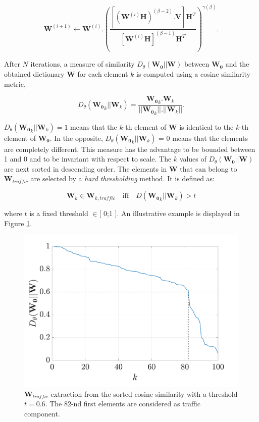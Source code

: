 \documentclass[twocolumn]{svjour3}          %
\begin{document}
\begin{equation}\label{eq:updateW_unsup}
\textbf{W}^{(i+1)} \leftarrow \mathbf{W}^{(i)}.\left(\frac{\left[\left(\mathbf{W}^{(i)}\mathbf{H} \right)^{(\beta-2)}.\mathbf{V} \right]\mathbf{H}^T}{\left[\mathbf{W}^{(i)}\mathbf{H} \right]^{(\beta-1)}\mathbf{H}^T}\right)^{\gamma(\beta)}.
\end{equation}

After $N$ iterations, a measure of similarity $D_{\theta}\left(\mathbf{W_0} \vert \vert \mathbf{W} \right)$ between $\mathbf{W_0}$ and the obtained dictionary $\mathbf{W}$ for each element $k$ is computed using a cosine similarity metric,

\begin{equation}
D_{\theta}\left(\mathbf{W_0}_k \vert \vert \mathbf{W}_k \right) = \frac{\mathbf{W_0}_k.\mathbf{W}_k}{\vert \vert \mathbf{W_0}_k  \vert \vert . \vert \vert \mathbf{W}_k \vert \vert}.
\end{equation}

$D_{\theta}\left(\mathbf{W_0}_k \vert \vert \mathbf{W}_k \right) = 1$ means that the $k$-th element of $\mathbf{W}$ is identical to the $k$-th element of $\mathbf{W_0}$. In the opposite, $D_{\theta}\left(\mathbf{W_0}_k \vert \vert \mathbf{W}_k \right)$ = 0 means that the elements are completely different. This measure has the advantage to be bounded between 1 and 0 and to be invariant with respect to scale. The $k$ values of $D_{\theta}\left(\mathbf{W_0} \vert \vert \mathbf{W} \right)$ are next sorted in descending order. The elements in $\mathbf{W}$ that can belong to $\mathbf{W}_{traffic}$ are selected by a \textit{hard thresholding} method. It is defined as:

\begin{equation}
\mathbf{W}_k \in \mathbf{W}_{k,traffic} \quad \text{iff} \quad D\left(\mathbf{W_0}_k \vert \vert \mathbf{W}_{k} \right) > t
\end{equation}

where $t$ is a fixed threshold $\in [$ 0;1 $]$.
An illustrative example is displayed in Figure \ref{fig:W_TI_NMF}.\\

\begin{figure}[t]
\centering
\includegraphics[width=0.8\linewidth]{figures/distanceCosLinDisplay.pdf}
\caption{$\mathbf{W}_{traffic}$ extraction from the sorted cosine similarity with a threshold $t = 0.6$. The $82$-nd first elements are considered as traffic component.}
\label{fig:W_TI_NMF}
\end{figure}
\end{document}
